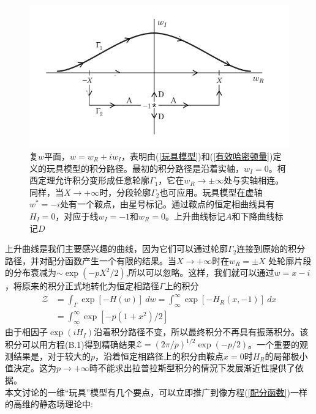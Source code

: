 \begin{figure}[H]
      \centering
      \includegraphics[width=12cm]{./figures/1.png}
      \caption{复$w$平面，$w =w_R + iw_I$，表明由(\ref{玩具模型})和(\ref{有效哈密顿量})定义的玩具模型的积分路径。最初的积分路径是沿着实轴，$w_I=0$。柯西定理允许积分变形成任意轮廓$\Gamma_1$，它在$w_R \rightarrow \pm \infty $处与实轴相连。同样，当$X \rightarrow +\infty$时，分段轮廓$\Gamma_2$也可应用。玩具模型在虚轴$w^*= -i$处有一个鞍点，由星号标记。通过鞍点的恒定相曲线具有$H_I=0$，对应于线$w_I=-1$和$w_R=0$。上升曲线标记$A$和下降曲线标记$D$}
      \label{复平面w}
\end{figure}
上升曲线是我们主要感兴趣的曲线，因为它们可以通过轮廓$\Gamma_2$连接到原始的积分路径，并对配分函数产生一个有限的结果。当$ X \rightarrow +\infty$时在$w_R=\pm X$ 处轮廓片段的分布衰减为$\sim \exp(-pX^2/2)$,所以可以忽略。这样，我们就可以通过$w =x -i$，将原来的积分正式地转化为恒定相路径$\Gamma$上的积分\\
\begin{equation}
\begin{aligned}
\mathcal{Z} &= \int_\Gamma \exp[-H(w)] \ dw = \int_\infty^\infty \exp[-H_R(x,-1)] \ dx\\
& =\int_\infty^\infty \exp[-p(1+x^2)/2]\label{恒定相路径积分}
\end{aligned}
\end{equation}
由于相因子$\exp(iH_I)$沿着积分路径不变，所以最终积分不再具有振荡积分。该积分可以用方程(B.1)得到精确结果$\mathcal{Z}=(2\pi/p)^{1/2}\exp(-p/2)$。一个重要的观测结果是，对于较大的$p$，沿着恒定相路径上的积分由鞍点$x=0$时$H_R$的局部极小值決定。这为$p\rightarrow +\infty$時不能求出拉普拉斯型积分的情況下发展渐近性提供了依据。\\

本文讨论的一维“玩具”模型有几个要点，可以立即推广到像方程(\ref{配分函数})一样的高维的静态场理论中:\\

